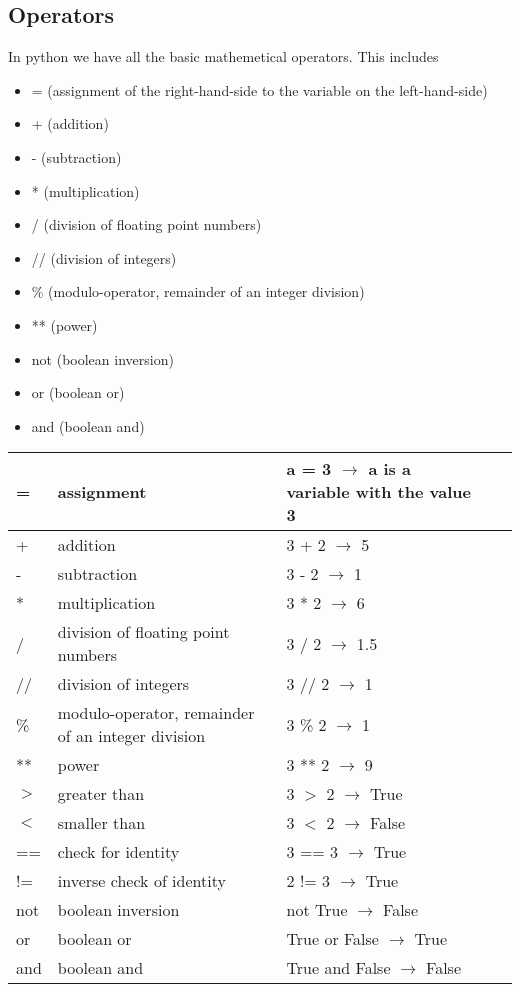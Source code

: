 \documentclass[10pt,a4paper]{article}
\begin{document}
\subsection{Operators}
In python we have all the basic mathemetical operators. This includes
\begin{itemize}
\item = (assignment of the right-hand-side to the variable on the left-hand-side)
\item + (addition)
\item - (subtraction)
\item * (multiplication)
\item / (division of floating point numbers)
\item // (division of integers)
\item \% (modulo-operator, remainder of an integer division)
\item ** (power)
\item not (boolean inversion)
\item or (boolean or)
\item and (boolean and)
\end{itemize}

\begin{table}[]
\begin{tabular}{|l|l|l|l|l|}
\hline
= & assignment & a = 3 $\rightarrow$ a is a variable with the value 3 \\ \hline
+ & addition & 3 + 2 $\rightarrow$ 5 \\ \hline
- & subtraction & 3 - 2 $\rightarrow$ 1 \\ \hline
* & multiplication & 3 * 2 $\rightarrow$ 6 \\ \hline
/ & division of floating point numbers & 3 / 2 $\rightarrow$ 1.5 \\ \hline
// & division of integers & 3 // 2 $\rightarrow$ 1 \\ \hline
\% & modulo-operator, remainder of an integer division & 3 \% 2 $\rightarrow$ 1 \\ \hline
** & power & 3 ** 2 $\rightarrow$ 9 \\ \hline
$>$ & greater than & 3 $>$ 2 $\rightarrow$ True \\ \hline
$<$ & smaller than & 3 $<$ 2 $\rightarrow$ False \\ \hline
== & check for identity & 3 == 3 $\rightarrow$ True \\ \hline
!= & inverse check of identity & 2 != 3 $\rightarrow$ True \\ \hline
not & boolean inversion & not True $\rightarrow$ False \\ \hline
or & boolean or & True or False $\rightarrow$ True \\ \hline
and & boolean and & True and False $\rightarrow$ False \\ \hline
\end{tabular}
\end{table}
\end{document}
